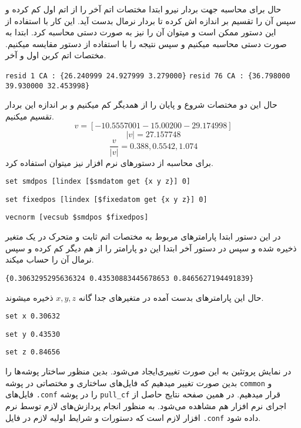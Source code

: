  حال برای محاسبه جهت بردار نیرو ابتدا مختصات اتم آخر را از اتم اول کم کرده و سپس آن را تقسیم بر اندازه اش کرده تا بردار نرمال بدست آید. این کار با استفاده از این دستور ممکن است و میتوان آن را نیز به صورت دستی محاسبه کرد.
 ابتدا به صورت دستی محاسبه میکنیم و سپس نتیجه را با استفاده از دستور مقایسه میکنیم.
مختصات اتم کربن  اول و آخر.
\begin{latin}
	\verb|resid 1 CA : {26.240999 24.927999 3.279000}|
	\verb|resid 76 CA : {36.798000 39.930000 32.453998}|
\end{latin}
حال این دو مختصات شروع و پایان را از همدیگر کم میکنیم و بر اندازه این بردار تقسیم میکنیم.
\begin{equation}
	v = [-10.5557001 -15.00200 -29.174998]
\end{equation}
\begin{equation}
	|v| = 27.157748
\end{equation}
\begin{equation}
	\frac{v}{|v|} = 0.388, 0.5542, 1.074
\end{equation}
برای محاسبه از دستور‌‌های نرم افزار  نیز میتوان استفاده کرد.
\begin{latin}
	\verb|set smdpos [lindex [$smdatom get {x y z}] 0]|
	
	\verb|set fixedpos [lindex [$fixedatom get {x y z}] 0]|
	
	\verb|vecnorm [vecsub $smdpos $fixedpos]|
\end{latin}
در این دستور ابتدا پارامتر‌‌های مربوط به مختصات اتم ثابت و متحرک در یک متغیر ذخیره شده و سپس در دستور آخر ابتدا این دو پارامتر را از هم دیگر کم کرده و سپس نرمال آن را حساب میکند.
\begin{latin}
	\verb|{0.3063295295636324 0.43530883445678653 0.8465627194491839}|
\end{latin}
حال این پارامتر‌‌های بدست آمده در متغیر‌‌های جدا گانه $x, y, z$ ذخیره میشوند.
\begin{latin}
	\verb|set x 0.30632|
	
	\verb|set y 0.43530|
	
	\verb|set z 0.84656|
\end{latin}
در نمایش پروتئین به این صورت تغییری‌ایجاد می‌شود.
بدین منظور ساختار پوشه‌ها را بدین صورت تغییر میدهیم که فایل‌‌های ساختاری و مختصاتی در پوشه \verb*|common| و فایل‌‌های \verb*|.conf| را در پوشه \verb*|pull_cf| قرار میدهیم.
در همین صفحه نتایج حاصل از اجرای نرم افزار  هم مشاهده می‌شود.
به منظور انجام پردازش‌‌های لازم توسط نرم افزار  لازم است که دستورات و شرایط اولیه لازم در فایل \verb*|.conf| داده شود.

